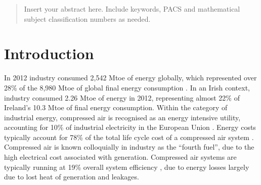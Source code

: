
\author{Se\'an Martin Hayes         \and
        D.T.J. O'Sullivan %
}



\date{Received: date / Accepted: date}


\maketitle

\begin{abstract}
Insert your abstract here. Include keywords, PACS and mathematical
subject classification numbers as needed.
\end{abstract}

\section{Introduction}
\label{intro}

In 2012 industry consumed 2,542 Mtoe of energy globally, which represented  over 28\% of the 8,980 Mtoe of global final energy consumption \cite{IEA2012}. In an Irish context, industry consumed 2.26 Mtoe of energy in 2012, representing almost 22\% of Ireland’s 10.3 Mtoe of final energy consumption. Within the category of industrial energy, compressed air is recognised as an energy intensive utility, accounting for 10\% of industrial electricity in the European Union \cite{Saidur2010}. Energy costs typically account for 78\% of the total life cycle cost of a compressed air system \cite{radgen2006efficiency}. Compressed air is known colloquially in industry as the “fourth fuel”, due to the high electrical cost associated with generation. Compressed air systems are typically running at 19\% overall system efficiency \cite{Saidur2010}, due to energy losses largely due to lost heat of generation and leakages.

